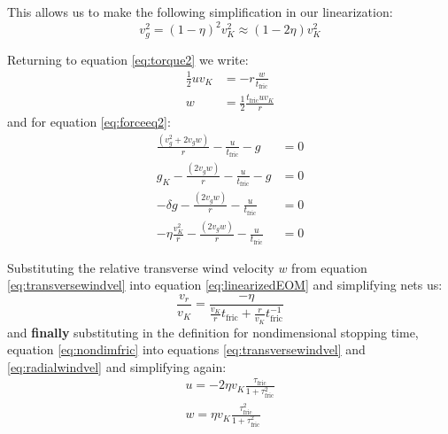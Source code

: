 \documentclass[12pt]{article}
\begin{document}
This allows us to make the following simplification in our linearization: 
$$v_g^2 = (1-\eta)^2v_K^2 \approx (1-2\eta)v_K^2 $$

Returning to equation \ref{eq:torque2} we write:
\begin{align}
    \frac{1}{2}uv_K &= -r\frac{w}{t_{\mathrm{fric}}} \\
    \label{eq:transversewindvel}
    w &= \frac{1}{2} \frac{t_{\mathrm{fric}} uv_K}{r}
\end{align}
\noindent and for equation \ref{eq:forceeq2}:
\begin{align}
    \frac{(v_g^2 +2v_gw)}{r} - \frac{u}{t_{\mathrm{fric}}} - g &= 0 \\
    g_K - \frac{(2v_gw)}{r}  - \frac{u}{t_{\mathrm{fric}}} - g &= 0 \\
    -\delta g - \frac{(2v_gw)}{r}  - \frac{u}{t_{\mathrm{fric}}} &= 0 \\
    \label{eq:linearizedEOM}
    -\eta \frac{v_K^2}{r} - \frac{(2v_gw)}{r}  - \frac{u}{t_{\mathrm{fric}}} &= 0 
\end{align}

Substituting the relative transverse wind velocity $w$ from equation \ref{eq:transversewindvel} into equation \ref{eq:linearizedEOM} and simplifying nets us:
\begin{equation}
   \label{eq:radialwindvel}
    \frac{v_r}{v_K} = \frac{-\eta}{ \frac{v_K}{r}t_{\mathrm{fric}} + \frac{r}{v_K}t_{\mathrm{fric}}^{-1}}
\end{equation}
\noindent and \textbf{finally} substituting in the definition for nondimensional stopping time, equation \ref{eq:nondimfric} into equations \ref{eq:transversewindvel} and \ref{eq:radialwindvel} and simplifying again:
\begin{align}
    \label{eq:nondimradialwindvel}
    u = -2\eta v_K \frac{\tau_{\mathrm{fric}}}{1 + \tau_{\mathrm{fric}}^2} \\
    \label{eq:nondimtransversewindvel}
    w = \eta v_K \frac{\tau_{\mathrm{fric}}^2}{1 + \tau_{\mathrm{fric}}^2}
\end{align}
\end{document}
